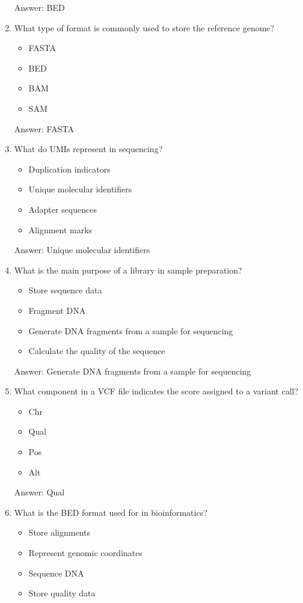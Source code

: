 \begin{enumerate}
Answer: BED

\item What type of format is commonly used to store the reference genome?
\begin{itemize}
\item FASTA
\item BED
\item BAM
\item SAM
\end{itemize}

Answer: FASTA

\item What do UMIs represent in sequencing?
\begin{itemize}
\item Duplication indicators
\item Unique molecular identifiers
\item Adapter sequences
\item Alignment marks
\end{itemize}

Answer: Unique molecular identifiers

\item What is the main purpose of a library in sample preparation?
\begin{itemize}
\item Store sequence data
\item Fragment DNA
\item Generate DNA fragments from a sample for sequencing
\item Calculate the quality of the sequence
\end{itemize}

Answer: Generate DNA fragments from a sample for sequencing

\item What component in a VCF file indicates the score assigned to a variant call?
\begin{itemize}
\item Chr
\item Qual
\item Pos
\item Alt
\end{itemize}

Answer: Qual

\item What is the BED format used for in bioinformatics?
\begin{itemize}
\item Store alignments
\item Represent genomic coordinates
\item Sequence DNA
\item Store quality data
\end{itemize}


\end{enumerate}
